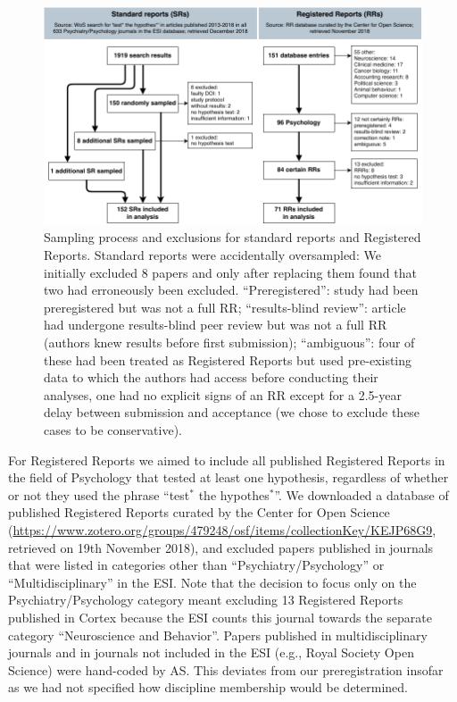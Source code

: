 \documentclass[british,,jou,floatsintext]{apa6}
\begin{document}
\begin{figure}
\includegraphics[width=\textwidth]{Sampling_exclusions_and_resampling} \caption{Sampling process and exclusions for standard reports and Registered Reports. Standard reports were accidentally oversampled: We initially excluded 8 papers and only after replacing them found that two had erroneously been excluded. \enquote{Preregistered}: study had been preregistered but was not a full RR; \enquote{results-blind review}: article had undergone results-blind peer review but was not a full RR (authors knew results before first submission); \enquote{ambiguous}: four of these had been treated as Registered Reports but used pre-existing data to which the authors had access before conducting their analyses, one had no explicit signs of an RR except for a 2.5-year delay between submission and acceptance (we chose to exclude these cases to be conservative).}\label{fig:sampling}
\end{figure}

For Registered Reports we aimed to include all published Registered Reports in the field of Psychology that tested at least one hypothesis, regardless of whether or not they used the phrase \enquote{test\(^\ast\) the hypothes\(^\ast\)}.
We downloaded a database of published Registered Reports curated by the Center for Open Science (\url{https://www.zotero.org/groups/479248/osf/items/collectionKey/KEJP68G9}, retrieved on 19th November 2018), and excluded papers published in journals that were listed in categories other than \enquote{Psychiatry/Psychology} or \enquote{Multidisciplinary} in the ESI.
Note that the decision to focus only on the Psychiatry/Psychology category meant excluding 13 Registered Reports published in Cortex because the ESI counts this journal towards the separate category \enquote{Neuroscience and Behavior}.
Papers published in multidisciplinary journals and in journals not included in the ESI (e.g., Royal Society Open Science) were hand-coded by AS.
This deviates from our preregistration insofar as we had not specified how discipline membership would be determined.
\end{document}
